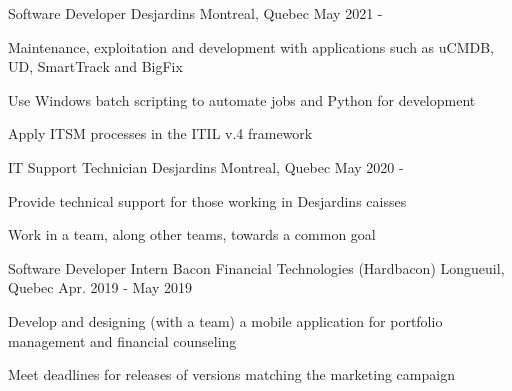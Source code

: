 

\begin{cventries}

  
  \cventry
    {Software Developer} %
    {Desjardins} %
    {Montreal, Quebec} %
    {May 2021 -} %
    {
      \begin{cvitems} %
        \item {Maintenance, exploitation and development with applications such as uCMDB, UD, SmartTrack and BigFix}
        \item {Use Windows batch scripting to automate jobs and Python for development}
        \item {Apply ITSM processes in the ITIL v.4 framework}
      \end{cvitems}
    }
    
  \cventry
    {IT Support Technician} %
    {Desjardins} %
    {Montreal, Quebec} %
    {May 2020 - } %
    {
      \begin{cvitems} %
        \item {Provide technical support for those working in Desjardins caisses}
        \item {Work in a team, along other teams, towards a common goal}
      \end{cvitems}
    }
    
  \cventry
    {Software Developer Intern} %
    {Bacon Financial Technologies (Hardbacon)} %
    {Longueuil, Quebec} %
    {Apr. 2019 - May 2019} %
    {
      \begin{cvitems} %
        \item {Develop and designing (with a team) a mobile application for portfolio management and financial counseling}
        \item {Meet deadlines for releases of versions matching the marketing campaign}
      \end{cvitems}
    }

\end{cventries}
